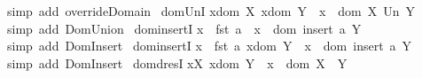 \begin{isabellebody}
%
\isadelimproof
%
\endisadelimproof
%
\isatagproof
{}\isamarkupfalse%
{\isacharparenleft}simp\ add{\isacharcolon}\ override{\isacharunderscore}Domain{\isacharparenright}%
\endisatagproof
{\isafoldproof}%
%
\isadelimproof
\isanewline
%
\endisadelimproof
\isanewline
{}\isamarkupfalse%
\ dom{\isacharunderscore}Un{\isacharunderscore}I{\isacharcolon}\isanewline
{\isachardoublequoteopen}{\isacharbrackleft}{\isacharbar}x{\isacharcolon}dom\ X{\isacharsemicolon}\ x{\isacharcolon}dom\ Y{\isacharbar}{\isacharbrackright}\ {\isacharequal}{\isacharequal}{\isachargreater}\ x\ {\isacharcolon}\ dom\ {\isacharparenleft}X\ Un\ Y{\isacharparenright}{\isachardoublequoteclose}\isanewline
%
\isadelimproof
%
\endisadelimproof
%
\isatagproof
{}\isamarkupfalse%
{\isacharparenleft}simp\ add{\isacharcolon}\ Dom{\isacharunderscore}Union{\isacharparenright}%
\endisatagproof
{\isafoldproof}%
%
\isadelimproof
\isanewline
%
\endisadelimproof
\isanewline
{}\isamarkupfalse%
\ dom{\isacharunderscore}insert{\isacharunderscore}I{}{\isacharcolon}\isanewline
{\isachardoublequoteopen}{\isacharbrackleft}{\isacharbar}x\ {\isacharequal}\ fst\ a{\isacharbar}{\isacharbrackright}\ {\isacharequal}{\isacharequal}{\isachargreater}\ x\ {\isacharcolon}\ dom\ {\isacharparenleft}insert\ a\ Y{\isacharparenright}{\isachardoublequoteclose}\isanewline
%
\isadelimproof
%
\endisadelimproof
%
\isatagproof
{}\isamarkupfalse%
{\isacharparenleft}simp\ add{\isacharcolon}\ Dom{\isacharunderscore}Insert{\isacharparenright}%
\endisatagproof
{\isafoldproof}%
%
\isadelimproof
\isanewline
%
\endisadelimproof
\isanewline
\isanewline
{}\isamarkupfalse%
\ dom{\isacharunderscore}insert{\isacharunderscore}I{}{\isacharcolon}\isanewline
{\isachardoublequoteopen}{\isacharbrackleft}{\isacharbar}x\ {\isasymnoteq}\ fst\ a{\isacharsemicolon}\ x{\isacharcolon}dom\ Y{\isacharbar}{\isacharbrackright}\ {\isacharequal}{\isacharequal}{\isachargreater}\ x\ {\isacharcolon}\ dom\ {\isacharparenleft}insert\ a\ Y{\isacharparenright}{\isachardoublequoteclose}\isanewline
%
\isadelimproof
%
\endisadelimproof
%
\isatagproof
{}\isamarkupfalse%
{\isacharparenleft}simp\ add{\isacharcolon}\ Dom{\isacharunderscore}Insert{\isacharparenright}%
\endisatagproof
{\isafoldproof}%
%
\isadelimproof
\isanewline
%
\endisadelimproof
\isanewline
\isanewline
{}\isamarkupfalse%
\ dom{\isacharunderscore}dres{\isacharunderscore}I{\isacharcolon}\isanewline
{\isachardoublequoteopen}{\isacharbrackleft}{\isacharbar}x{\isacharcolon}X{\isacharsemicolon}\ x{\isacharcolon}dom\ Y{\isacharbar}{\isacharbrackright}\ {\isacharequal}{\isacharequal}{\isachargreater}\ x\ {\isacharcolon}\ dom\ {\isacharparenleft}X\ {\isacharless}{\isacharcolon}\ Y{\isacharparenright}{\isachardoublequoteclose}\isanewline

\end{isabellebody}
